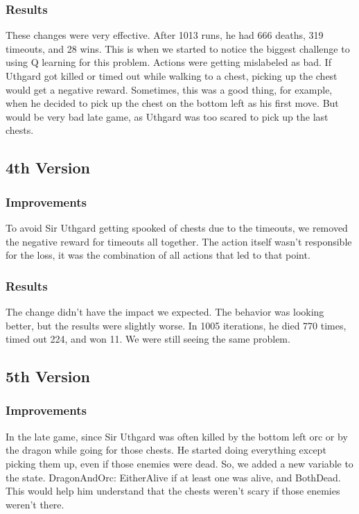 \documentclass{article}
\begin{document}
  \subsubsection{Results}

  These changes were very effective. After 1013 runs, he had 666 deaths, 319 timeouts, and 28 wins. This is when we started to notice the biggest challenge to using Q learning for this problem. 
  Actions were getting mislabeled as bad. If Uthgard got killed or timed out while walking to a chest, picking up the chest would get a negative reward. 
  Sometimes, this was a good thing, for example, when he decided to pick up the chest on the bottom left as his first move. But would be very bad late game, as Uthgard was too scared to pick up the last chests.

  \subsection{4th Version}

  \subsubsection{Improvements}

  To avoid Sir Uthgard getting spooked of chests due to the timeouts, we removed the negative reward for timeouts all together. The action itself wasn't responsible for the loss, it was the combination of all actions that led to that point.  
  
  \subsubsection{Results}

  The change didn't have the impact we expected. The behavior was looking better, but the results were slightly worse. In 1005 iterations, he died 770 times, timed out 224, and won 11. We were still seeing the same problem.

  \subsection{5th Version}

  \subsubsection{Improvements}
  
  In the late game, since Sir Uthgard was often killed by the bottom left orc or by the dragon while going for those chests. He started doing everything except picking them up, even if those enemies were dead.
  So, we added a new variable to the state. DragonAndOrc: EitherAlive if at least one was alive, and BothDead. This would help him understand that the chests weren't scary if those enemies weren't there. 
\end{document}
